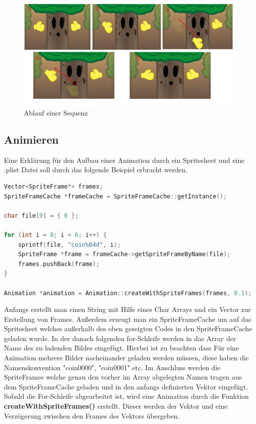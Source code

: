 \begin{figure}[H]
  \centering
  \includegraphics[width=15.5cm]{resources/dokubaum}
  \caption{Ablauf einer Sequenz}
  \label{fig:dokubaum} 
\end{figure}

\subsection{Animieren}
Eine Erklärung für den Aufbau einer Animation durch ein Spritesheet und eine .plist Datei soll durch das folgende Beispiel erbracht werden.

\begin{lstlisting}[label=lst:build_josie_animation,
				   language=C++,
				   firstnumber=53,
				   caption=Sequence erstellen ( CollisionLayer.cpp )]
Vector<SpriteFrame*> frames;
SpriteFrameCache *frameCache = SpriteFrameCache::getInstance();

char file[9] = { 0 };

for (int i = 0; i < 6; i++) {
	sprintf(file, "coin%04d", i);
	SpriteFrame *frame = frameCache->getSpriteFrameByName(file);
	frames.pushBack(frame);
}

Animation *animation = Animation::createWithSpriteFrames(frames, 0.1);
\end{lstlisting}

Anfangs erstellt man einen String mit Hilfe eines Char Arrays und ein Vector zur Erstellung von Frames. Außerdem erzeugt man ein SpriteFrameCache um auf das Spritesheet welches außerhalb des oben gezeigten Codes in den SpriteFrameCache geladen wurde. In der danach folgenden for-Schleife werden
in das Array der Name des zu ladenden Bildes eingefügt. Hierbei ist zu beachten dass Für eine Animation mehrere Bilder nacheinander geladen werden müssen, diese haben die Namenskonvention "coin0000", "coin0001" etc. Im Anschluss werden die SpriteFrames welche genau den vorher im Array abgelegten Namen tragen aus dem SpriteFrameCache geladen und in den anfangs definierten Vektor eingefügt. 
Sobald die For-Schleife abgearbeitet ist, wird eine Animation durch die Funktion \textbf{createWithSpriteFrames()} erstellt. Dieser werden der Vektor und eine Verzögerung zwischen den Frames des Vektors übergeben.

